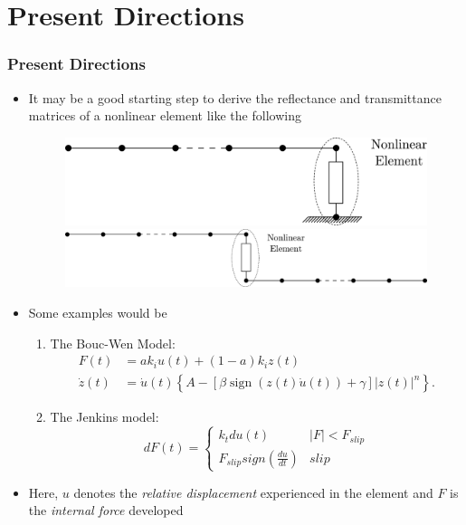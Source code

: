 \documentclass[aspectratio=169]{beamertmd}
\begin{document}
\section{Present Directions}
\label{sec:present-directions}

\begin{frame}[allowframebreaks]
  \frametitle{Present Directions}
  \begin{itemize}
  \item It may be a good starting step to derive the reflectance and
    transmittance matrices of a nonlinear element like the following
    \begin{figure}
      \centering
      \includegraphics[width=0.6\linewidth]{FIGS/SIMPMODS_1}
      
      \includegraphics[width=\linewidth]{FIGS/SIMPMODS_2}
    \end{figure}
  \item Some examples would be
    \begin{enumerate}
    \item The Bouc-Wen Model:
      \begin{align*}
        F(t) &= ak_{i}u(t)+(1-a)k_{i}z(t)\\
        {\dot {z}}(t) &= {\dot {u}}(t)\left\{A-\left[\beta \operatorname {sign} (z(t){\dot {u}}(t))+\gamma \right]|z(t)|^{n}\right\}.
      \end{align*}
    \item The Jenkins model:
      $$ dF(t) = \begin{cases} k_t du(t) & |F|<F_{slip}\\ F_{slip}
        sign(\frac{du}{dt}) & slip \end{cases} $$
    \end{enumerate}
  \item Here, $u$ denotes the \emph{relative displacement} experienced in the
    element and $F$ is the \emph{internal force} developed
  \end{itemize}
\end{frame}
\end{document}
